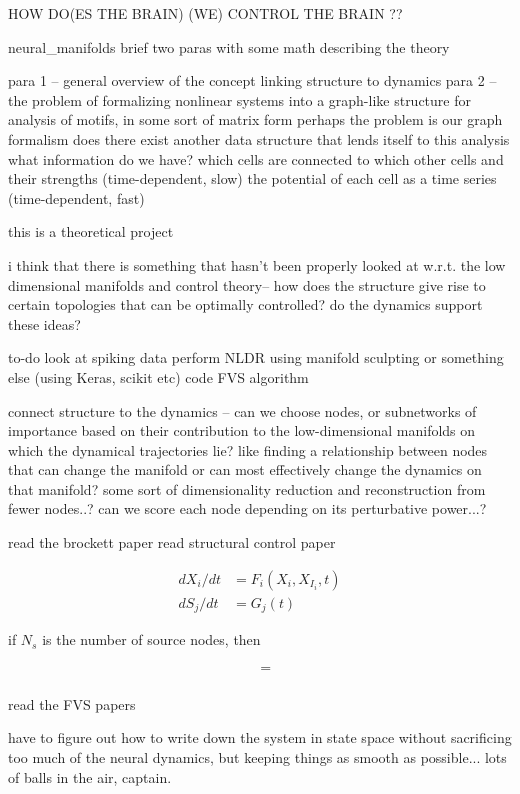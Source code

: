 \documentclass[a4paper,12pt]{article}
\begin{document}
HOW DO(ES THE BRAIN) (WE) CONTROL THE BRAIN ?? 

neural\_manifolds brief 
two paras with some math describing the theory 

para 1 -- general overview of the concept linking structure to dynamics 
para 2 -- the problem of formalizing nonlinear systems into a graph-like structure for analysis 
	of motifs, in some sort of matrix form
	perhaps the problem is our graph formalism
		does there exist another data structure that lends itself to this analysis 
	what information do we have?
		which cells are connected to which other cells and their strengths (time-dependent, slow)
		the potential of each cell as a time series (time-dependent, fast)

this is a theoretical project 

i think that there is something that hasn't been properly looked at w.r.t. the low dimensional manifolds and control theory-- how does the structure give rise to certain topologies that can be optimally controlled? do the dynamics support these ideas?

to-do
	look at spiking data 
	perform NLDR using manifold sculpting or something else (using Keras, scikit etc)
	code FVS algorithm 

connect structure to the dynamics -- can we choose nodes, or subnetworks of importance based on their contribution to the low-dimensional manifolds on which the dynamical trajectories lie? like finding a relationship between nodes that can change the manifold or can most effectively change the dynamics on that manifold? 
	some sort of dimensionality reduction and reconstruction from fewer nodes..? 
	can we score each node depending on its perturbative power...? 

read the brockett paper \cite{Brockett2014}
read structural control paper \cite{Zanudo2017}

\begin{align}
	dX_i/dt &= F_i(X_i,X_{I_i},t) \\ 
	dS_j/dt &= G_j(t)
\end{align}

if $N_s$ is the number of source nodes, then 

\begin{align}
&= \\ 
\end{align}

read the FVS papers \cite{Betzel} \cite{Whalen2016}

have to figure out how to write down the system in state space without sacrificing too much of the neural dynamics, but keeping things as smooth as possible... lots of balls in the air, captain. 
\end{document}
